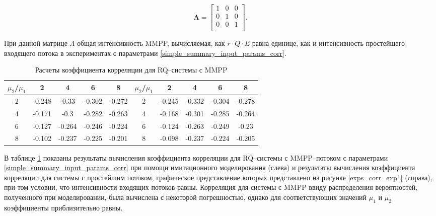  \begin{equation*}
	\boldsymbol{\Lambda}=\begin{bmatrix}
		1 &	0 & 0\\
		0 &	1 & 0\\
		0 &	0 & 1\\
	\end{bmatrix}.
\end{equation*}

При данной матрице $\Lambda$ общая интенсивность MMPP, вычисляемая, как $r\cdot Q\cdot E$ равна единице, как и интенсивность простейшего входящего потока в экспериментах с параметрами \eqref{simple_summary_input_params_corr}.

\begin{table}[htb!] 
	\centering
	\caption{Расчеты коэффициента корреляции для RQ--системы с MMPP}
	\label{corr_mmpp_table}
	\begin{tabular}{| c | c | c | c | c || c | c | c | c | c |}
		\hline
		$\mu_{2}$/$\mu_{1}$ & 2 & 4 & 6 & 8 & $\mu_{2}$/$\mu_{1}$ &  2 & 4 & 6 & 8\\ 
		\hline
		2 & -0.248 & -0.33 & -0.302 & -0.272 & 2 & -0.245 & -0.332 & -0.304 & -0.278 \\
		\hline
		4 & -0.171 & -0.3 & -0.282 & -0.263 & 4 & -0.168 & -0.301 & -0.285 & -0.264 \\
		\hline
		6 & -0.127 & -0.264 & -0.246 & -0.224 & 6 & -0.124 & -0.263 & -0.249 & -0.23\\
		\hline
		8 & -0.102 & -0.237 & -0.225 & -0.201 & 8 & -0.098 & -0.237 & -0.224 & -0.205\\
		\hline
	\end{tabular}
\end{table}

В таблице \ref{corr_mmpp_table} показаны результаты вычисления коэффициента корреляции для RQ--системы с MMPP--потоком с параметрами \eqref{simple_summary_input_params_corr} при помощи имитационного моделирования (слева) и результаты вычисления коэффициента корреляции для системы с простейшим потоком, графическое представление которых представлено на рисунке \ref{exps_corr_exp1} (cправа), при том условии, что интенсивности входящих потоков равны. Корреляция для системы с MMPP ввиду распределения вероятностей, полученного при моделировании, была вычислена с некоторой погрешностью, однако для соответствующих значений $\mu_{1}$ и $\mu_{2}$ коэффициенты приблизительно равны.

